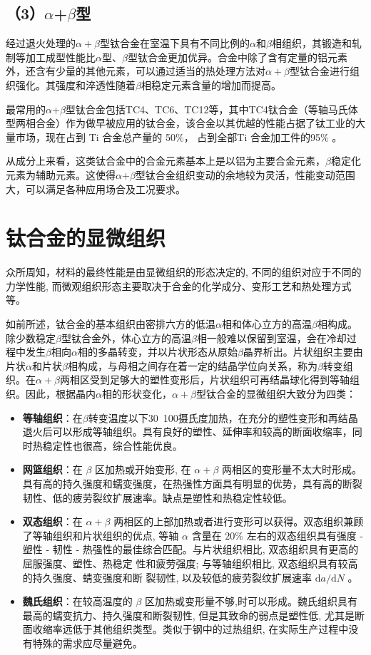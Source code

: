 \subsection*{（3）$\alpha$+$\beta$型}
经过退火处理的$\alpha+\beta$型钛合金在室温下具有不同比例的$\alpha$和$\beta$相组织，其锻造和轧制等加工成型性能比$\alpha$型、$\beta$型钛合金更加优异。合金中除了含有定量的铝元素外，还含有少量的其他元素，可以通过适当的热处理方法对$\alpha+\beta$型钛合金进行组织强化。其强度和淬透性随着$\beta$相稳定元素含量的增加而提高。

最常用的$\alpha$+$\beta$型钛合金包括TC4、TC6、TC12等，其中TC4钛合金（等轴马氏体型两相合金）作为做早被应用的钛合金，该合金以其优越的性能占据了钛工业的大量市场，现在占到 Ti 合金总产量的 50$ \%  $， 占到全部Ti 合金加工件的95$ \% $ 。

从成分上来看，这类钛合金中的合金元素基本上是以铝为主要合金元素，$\beta$稳定化元素为辅助元素。这使得$\alpha$+$\beta$型钛合金组织变动的余地较为灵活，性能变动范围大，可以满足各种应用场合及工况要求\cite{TiandAl}。
\section{钛合金的显微组织}
众所周知，材料的最终性能是由显微组织的形态决定的, 不同的组织对应于不同的力学性能, 而微观组织形态主要取决于合金的化学成分、变形工艺和热处理方式等。

如前所述，钛合金的基本组织由密排六方的低温$\alpha$相和体心立方的高温$\beta$相构成。除少数稳定$\beta$型钛合金外，体心立方的高温$\beta$相一般难以保留到室温，会在冷却过程中发生$\beta$相向$\alpha$相的多晶转变，并以片状形态从原始$\beta$晶界析出。片状组织主要由片状$\alpha$和片状$\beta$相构成，与母相之间存在着一定的结晶学位向关系，称为$\beta$转变组织。在$\alpha+\beta$两相区受到足够大的塑性变形后，片状组织可再结晶球化得到等轴组织。因此，根据晶内$\alpha$相的形状变化，$\alpha+\beta$型钛合金的显微组织大致分为四类：

\begin{itemize}
	\item 	\textbf{等轴组织}：在$\beta$转变温度以下30~100摄氏度加热，在充分的塑性变形和再结晶退火后可以形成等轴组织。具有良好的塑性、延伸率和较高的断面收缩率，同时热稳定性也很高，综合性能优良。
	\item 	\textbf{网篮组织}：在 $\beta$ 区加热或开始变形, 在 $\alpha+\beta$ 两相区的变形量不太大时形成。具有高的持久强度和蠕变强度，在热强性方面具有明显的优势，具有高的断裂韧性、低的疲劳裂纹扩展速率。缺点是塑性和热稳定性较低。
	\item 	\textbf{双态组织}：在 $\alpha+\beta$ 两相区的上部加热或者进行变形可以获得。双态组织兼顾了等轴组织和片状组织的优点, 等轴 $\alpha$ 含量在 $20 \%$ 左右的双态组织具有强度 - 塑性 - 韧性 - 热强性的最佳综合匹配。与片状组织相比, 双态组织具有更高的屈服强度、塑性、热稳定 性和疲劳强度; 与等轴组织相比, 双态组织具有较高的持久强度、蜻变强度和断 裂韧性, 以及较低的疲劳裂纹扩展速率 $\mathrm{d} a / \mathrm{d} N$ 。
	\item 	\textbf{魏氏组织}：在较高温度的 $\beta$ 区加热或变形量不够,时可以形成。魏氏组织具有最高的蠕变抗力、持久强度和断裂韧性, 但是其致命的弱点是塑性低, 尤其是断面收缩率远低于其他组织类型。类似于钢中的过热组织, 在实际生产过程中没有特殊的需求应尽量避免。
\end{itemize}

